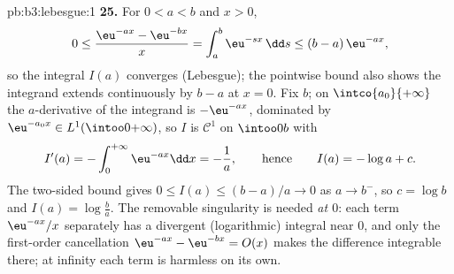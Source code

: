 \begin{solution}{pb:b3:lebesgue:1}
\textbf{25.} For $0 < a < b$ and $x > 0$,
\[
0 \leq \frac{\eu^{-ax} - \eu^{-bx}}{x}
= \int_a^b \eu^{-sx}\,\dd s \leq (b - a)\,\eu^{-ax},
\]
so the integral $I(a)$ converges (Lebesgue); the pointwise
bound also shows the integrand extends continuously by $b -
a$ at $x = 0$. Fix $b$; on $\intco{a_0}{+\infty}$ the
$a$-derivative of the integrand is $-\eu^{-ax}$, dominated by
$\eu^{-a_0x} \in L^1(\intoo0{+\infty})$, so $I$ is $\mathcal
C^1$ on $\intoo0b$ with
\[
I'(a) = -\int_0^{+\infty}\eu^{-ax}\dd x = -\frac1a,
\qquad\text{hence}\qquad
I(a) = -\log a + c .
\]
The two-sided bound gives $0 \leq I(a) \leq (b-a)/a \to 0$ as
$a \to b^-$, so $c = \log b$ and $I(a) = \log\frac ba$. The
removable singularity is needed \emph{at $0$}: each term
$\eu^{-ax}/x$ separately has a divergent (logarithmic)
integral near $0$, and only the first-order cancellation
$\eu^{-ax} - \eu^{-bx} = O(x)$ makes the difference
integrable there; at infinity each term is harmless on its
own.
\end{solution}
